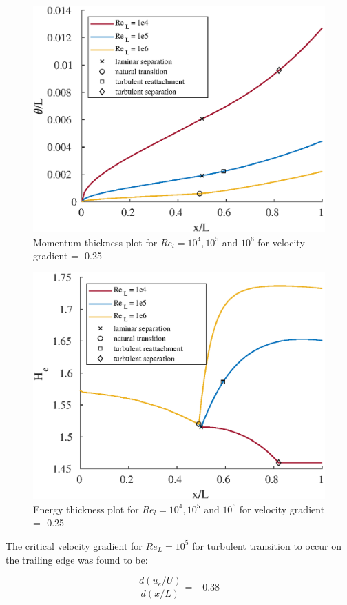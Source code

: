 \begin{figure}[H]
\centering
\includegraphics[scale=0.8]{graphs/e6g3.eps}
\caption{Momentum thickness plot for $Re_l = 10^4, 10^5$ and $10^6$ for velocity gradient = -0.25}
\label{e6g3}
\end{figure}

\begin{figure}[H]
\centering
\includegraphics[scale=0.8]{graphs/e6g4.eps}
\caption{Energy thickness plot for $Re_l = 10^4, 10^5$ and $10^6$ for velocity gradient = -0.25}
\label{e6g4}
\end{figure}

\pagebreak


  
\vspace{0.20cm}
  
  The critical velocity gradient for $Re_L = 10^5$ for turbulent transition to occur on the trailing edge was found to be:
  
  \vspace{0.1cm}
  \[\frac{d(u_e/U)}{d(x/L)} = -0.38\]
  
\pagebreak